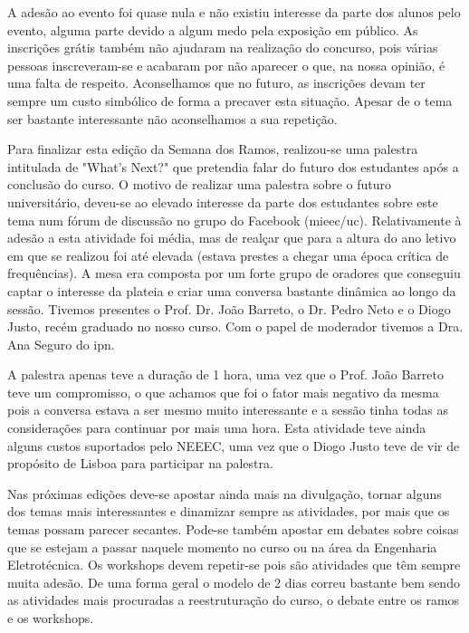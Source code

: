 A adesão ao evento foi quase nula e não existiu interesse da parte dos alunos pelo evento, alguma parte devido a algum medo pela exposição em público. As inscrições grátis também não ajudaram na realização do concurso, pois várias pessoas inscreveram-se e acabaram por não aparecer o que, na nossa opinião, é uma falta de respeito. Aconselhamos que no futuro, as inscrições devam ter sempre um custo simbólico de forma a precaver esta situação. Apesar de o tema ser bastante interessante não aconselhamos a sua repetição.

Para finalizar esta edição da Semana dos Ramos, realizou-se uma palestra intitulada de "What's Next?" que pretendia falar do futuro dos estudantes após a conclusão do curso. O motivo de realizar uma palestra sobre o futuro universitário, deveu-se ao elevado interesse da parte dos estudantes sobre este tema num fórum de discussão no grupo do Facebook (\acrshort{mieec}/\acrshort{uc}). Relativamente à adesão a esta atividade foi média, mas de realçar que para a altura do ano letivo em que se realizou foi até elevada (estava prestes a chegar uma época crítica de frequências).  A mesa era composta por um forte grupo de oradores que conseguiu captar o interesse da plateia e criar uma conversa bastante dinâmica ao longo da sessão. Tivemos presentes o Prof. Dr. João Barreto, o Dr. Pedro Neto e o Diogo Justo, recém graduado no nosso curso. Com o papel de moderador tivemos a Dra. Ana Seguro do \acrfull{ipn}.

A palestra apenas teve a duração de 1 hora, uma vez que o Prof. João Barreto teve um compromisso, o que achamos que foi o fator mais negativo da mesma pois a conversa estava a ser mesmo muito interessante e a sessão tinha todas as considerações para continuar por mais uma hora. Esta atividade teve ainda alguns custos suportados pelo NEEEC, uma vez que o Diogo Justo teve de vir de propósito de Lisboa para participar na palestra. 

Nas próximas edições deve-se apostar ainda mais na divulgação, tornar alguns dos temas mais interessantes e dinamizar sempre as atividades, por mais que os temas possam parecer secantes. Pode-se também apostar em debates sobre coisas que se estejam a passar naquele momento no curso ou na área da Engenharia Eletrotécnica. Os workshops devem repetir-se pois são atividades que têm sempre muita adesão. De uma forma geral o modelo de 2 dias correu bastante bem sendo as atividades mais procuradas a reestruturação do curso, o debate entre os ramos e os workshops.